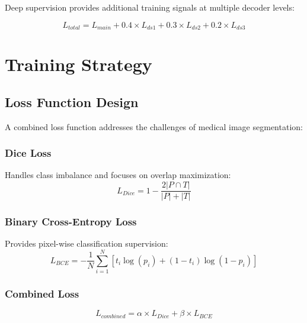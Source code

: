 Deep supervision provides additional training signals at multiple decoder levels:


\begin{equation}
L_{total} = L_{main} + 0.4 \times L_{ds1} + 0.3 \times L_{ds2} + 0.2 \times L_{ds3}
\end{equation}

\section{Training Strategy}

\subsection{Loss Function Design}

A combined loss function addresses the challenges of medical image segmentation:

\subsubsection{Dice Loss}
Handles class imbalance and focuses on overlap maximization:
\begin{equation}
L_{Dice} = 1 - \frac{2|P \cap T|}{|P| + |T|}
\end{equation}

\subsubsection{Binary Cross-Entropy Loss}
Provides pixel-wise classification supervision:
\begin{equation}
L_{BCE} = -\frac{1}{N}\sum_{i=1}^{N}[t_i \log(p_i) + (1-t_i)\log(1-p_i)]
\end{equation}

\subsubsection{Combined Loss}
\begin{equation}
L_{combined} = \alpha \times L_{Dice} + \beta \times L_{BCE}
\end{equation}

